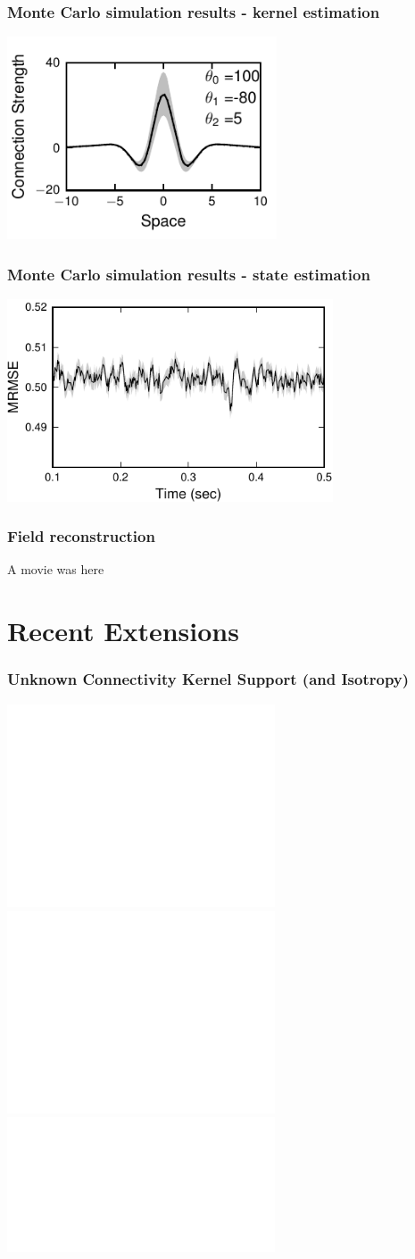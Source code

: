 \documentclass[compress]{beamer}
\begin{document}
\begin{frame}\frametitle{Monte Carlo simulation results - kernel estimation}
	\begin{center}
		\includegraphics[height=6cm]{./Figures/Figure10a.pdf}
	\end{center}	
\end{frame}

\begin{frame}\frametitle{Monte Carlo simulation results - state estimation}
	\begin{center}
		\includegraphics[height=6cm]{./Figures/fig8.pdf}
	\end{center}	
\end{frame}

\begin{frame} \frametitle{Field reconstruction}
	A movie was here
\end{frame}

\section[Recent Extensions]{Recent Extensions}

\begin{frame}\frametitle{Unknown Connectivity Kernel Support (and Isotropy)}

	\begin{center}
		\includegraphics<1>[height=6cm]{./Figures/KernelBasis1.pdf}
		\includegraphics<2>[height=6cm]{./Figures/KernelConvergence.pdf} 
		\includegraphics<3>[height=4cm]{./Figures/KernelEstimateCrossSection.pdf}  	
	\end{center}
\end{frame}
\end{document}
